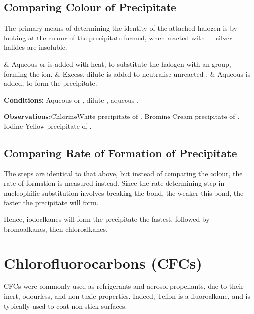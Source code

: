 		\subsection{Comparing Colour of Precipitate}
			The primary means of determining the identity of the attached halogen is by looking at the colour of the precipitate formed, when
			reacted with  --- silver halides are insoluble.

			\begin{numberedlist}
				&	Aqueous  or  is added with heat, to substitute the halogen with an  group, forming the  ion.
				&	Excess, dilute  is added to neutralise unreacted .
				&	Aqueous  is added, to form the  precipitate.
			\end{numberedlist}

			\vspace{1.5em}
			\vbox{\textbf{Conditions:}	\tabto{35mm}Aqueous  or , dilute , aqueous .}

			\vspace{0.75em}
			\vbox{\textbf{Observations:}\tabto{35mm}Chlorine\tabto{60mm}White precipitate of .
										\tabto{35mm}Bromine	\tabto{60mm}Cream precipitate of .
										\tabto{35mm}Iodine	\tabto{60mm}Yellow precipitate of .}

		\subsection{Comparing Rate of Formation of Precipitate}

			The steps are identical to that above, but instead of comparing the colour, the rate of formation is measured instead. Since the
			rate-determining step in nucleophilic substitution involves breaking the  bond, the weaker this bond, the faster the
			precipitate will form.

			Hence, iodoalkanes will form the precipitate the fastest, followed by bromoalkanes, then chloroalkanes.



	\pagebreak
	\section{Chlorofluorocarbons (CFCs)}

		CFCs were commonly used as refrigerants and aerosol propellants, due to their inert, odourless, and non-toxic properties.
		Indeed, Teflon is a fluoroalkane, and is typically used to coat non-stick surfaces.

